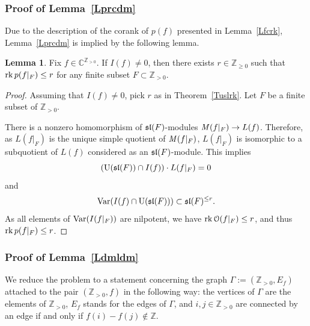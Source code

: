 \documentclass[10pt]{amsart}\oddsidemargin -1mm \evensidemargin -1mm \topmargin -15mm\headheight5mm \headsep 3.5mm \textheight 245mm\textwidth 170mm %
\theoremstyle{definition}\newtheorem{theorem}{Theorem}[section]\newtheorem{lemma}[theorem]{Lemma}\newtheorem{remark}[theorem]{Remark}\newtheorem{proposition}[theorem]{Proposition}\newtheorem{corollary}[theorem]{Corollary}\newtheorem{definition}[theorem]{Definition}\newtheorem{Ex}[theorem]{Example}
\newcounter{AP}
\begin{document}
\subsubsection{Proof of Lemma~\ref{Lprcdm}}\label{SSSc1} Due to the description
of the corank of $p(f)$ presented in Lemma~\ref{Lfcrk}, Lemma~\ref{Lprcdm} is
implied by the following lemma.
\begin{lemma}\label{Lrkf}Fix $f\in \mathbb C^{\mathbb Z_{>0}}$. If $I(f)\ne0$, then there exists $r\in\mathbb Z_{\ge0}$
such that $\operatorname{\mathrm{rk}} p(f|_{F})\le r$ for any finite subset $F\subset \mathbb Z_{>0}$.\end{lemma}
\begin{proof}Assuming that $I(f)\ne0$, pick $r$ as in Theorem~\ref{Tuslrk}.
Let $F$ be a finite subset of $\mathbb Z_{>0}$.

There is a nonzero homomorphism of $\frak{sl}(F)$-modules $\operatorname{{\it M}}(f|_{F})\to
L(f)$. Therefore, as $L(f|_{F})$ is the unique simple quotient of $\operatorname{{\it M}}(f|_{F})$,
$L(f|_{F})$ is isomorphic to a subquotient of $L(f)$ considered as
an $\frak{sl}(F)$-module. This implies $$(\operatorname{\mathrm{U}}(\frak{sl}(F))\cap
I(f))\cdot L(f|_F)=0$$and$$%
\Var(I(f)\cap\Ue(\frak{sl}(F)))\subset\frak{sl}(F)^{\le r}.$$ As all elements of $\operatorname{\mathrm{Var}}(I(f|_F))$ are
nilpotent, we have $\operatorname{\mathrm{rk}} \EuScript O(f|_F)\le r$, and thus
$\operatorname{\mathrm{rk}} p(f|_{F})\le r$.\end{proof}

\subsubsection{Proof of Lemma~\ref{Ldmldm}}\label{SSSc2}We reduce the problem to a statement concerning the graph
$\Gamma:=(\mathbb Z_{>0}, E_f)$ attached to the pair $(\mathbb Z_{>0}, f)$  in the following way: the vertices of $\Gamma$ are the elements of $\mathbb Z_{>0}$, $E_f$ stands for the edges of $\Gamma$, and $i, j\in \mathbb Z_{>0}$ are connected by an edge if and only if
$f(i)-f(j)\notin\mathbb Z$.
\end{document}
